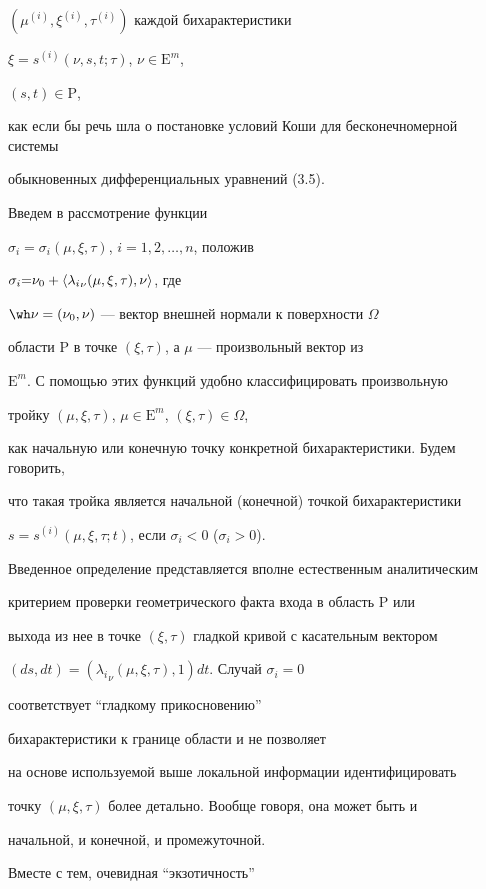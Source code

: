 $(\mu^{(i)},\xi^{(i)},\tau^{(i)})$ каждой бихарактеристики 


$\xi=s^{(i)}(\nu,s,t;\tau)$, $\nu \in {\mathrm E}^m$,


$(s,t) \in {\mathrm P}$,


как если бы речь шла о постановке условий Коши для бесконечномерной системы 


обыкновенных дифференциальных уравнений (3.5).





Введем в рассмотрение функции 


$\sigma_i{=}\sigma_i(\mu,\xi,\tau)$, $i{=}1,2,\dotsc,n$, положив 


$\sigma_i{=}\nu_0+\langle{\lambda_i}_\nu (\mu,\xi,\tau), \nu\rangle$, где 


$\wh\nu=(\nu_0,\nu)$ --- вектор внешней нормали к поверхности $\Omega$ 


области $\mathrm P$ в точке $(\xi, \tau)$, а $\mu$ --- произвольный вектор из


${\mathrm E}^m$. С помощью этих функций удобно классифицировать произвольную 


тройку $(\mu,\xi,\tau)$, $\mu \in {\mathrm E}^m$, $(\xi,\tau) \in \Omega$, 


как начальную или конечную точку конкретной бихарактеристики. Будем говорить,


что такая тройка является начальной (конечной) точкой бихарактеристики 


$s=s^{(i)}(\mu,\xi,\tau;t)$, если $\sigma_i < 0$ ($\sigma_i > 0$).


Введенное определение представляется вполне естественным аналитическим 


критерием проверки геометрического факта входа в область ${\mathrm P}$ или


выхода из нее в точке $(\xi,\tau)$ гладкой кривой с касательным вектором


$(ds,dt)=({\lambda_i}_\nu (\mu,\xi,\tau), 1)dt$. Случай $\sigma_i=0$


соответствует ``гладкому прикосновению''


бихарактеристики к границе области и не позволяет 


на основе используемой выше локальной информации идентифицировать


точку $(\mu,\xi,\tau)$ более детально. Вообще говоря, она может быть и 


начальной, и конечной, и промежуточной.


Вместе с тем, очевидная ``экзотичность''


